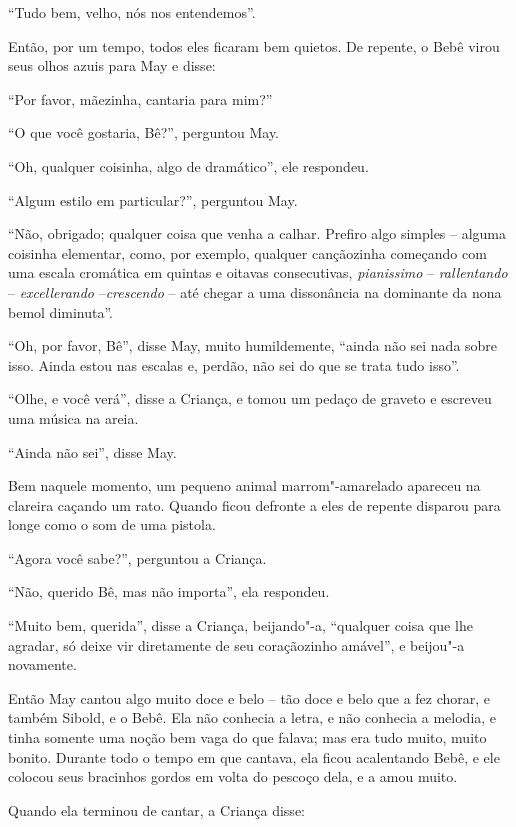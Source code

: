 ``Tudo bem, velho, nós nos entendemos''.

Então, por um tempo, todos eles ficaram bem quietos. De repente, o Bebê
virou seus olhos azuis para May e disse:

``Por favor, mãezinha, cantaria para mim?''

``O que você gostaria, Bê?'', perguntou May.

``Oh, qualquer coisinha, algo de dramático'', ele respondeu.

``Algum estilo em particular?'', perguntou May.

``Não, obrigado; qualquer coisa que venha a calhar. Prefiro algo simples
-- alguma coisinha elementar, como, por exemplo, qualquer cançãozinha
começando com uma escala cromática em quintas e oitavas consecutivas,
\emph{pianissimo} -- \emph{rallentando} -- \emph{excellerando}
--\emph{crescendo} -- até chegar a uma dissonância na dominante da nona
bemol diminuta''.

``Oh, por favor, Bê'', disse May, muito humildemente, ``ainda não sei
nada sobre isso. Ainda estou nas escalas e, perdão, não sei do que se
trata tudo isso''.

``Olhe, e você verá'', disse a Criança, e tomou um pedaço de graveto e
escreveu uma música na areia.


``Ainda não sei'', disse May.

Bem naquele momento, um pequeno animal marrom"-amarelado apareceu na
clareira caçando um rato. Quando ficou defronte a eles de repente
disparou para longe como o som de uma pistola.

``Agora você sabe?'', perguntou a Criança.

``Não, querido Bê, mas não importa'', ela respondeu.

``Muito bem, querida'', disse a Criança, beijando"-a, ``qualquer coisa
que lhe agradar, só deixe vir diretamente de seu coraçãozinho amável'',
e beijou"-a novamente.

Então May cantou algo muito doce e belo -- tão doce e belo que a fez
chorar, e também Sibold, e o Bebê. Ela não conhecia a letra, e não
conhecia a melodia, e tinha somente uma noção bem vaga do que falava;
mas era tudo muito, muito bonito. Durante todo o tempo em que cantava,
ela ficou acalentando Bebê, e ele colocou seus bracinhos gordos em volta
do pescoço dela, e a amou muito.

Quando ela terminou de cantar, a Criança disse:

